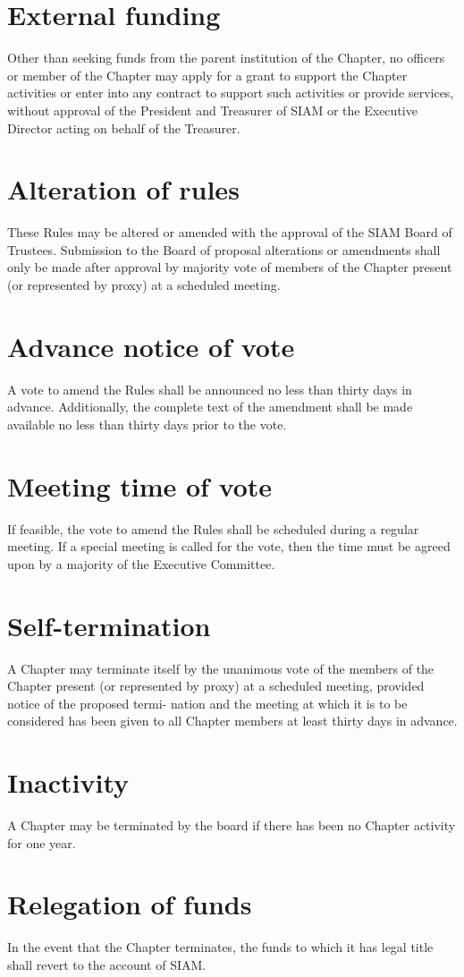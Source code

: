 \documentclass{ronr-bylaws}
\begin{document}
\section{External funding}
Other than seeking funds from the parent institution of the Chapter, no officers
or member of the Chapter may apply for a grant to support the Chapter activities or enter into
any contract to support such activities or provide services, without approval of the President and
Treasurer of SIAM or the Executive Director acting on behalf of the Treasurer.

\section{Alteration of rules}
These Rules may be altered or amended with the approval of the SIAM Board of Trustees. Submission to the Board of proposal alterations or amendments shall only be made after approval by majority vote of members of the Chapter present (or represented by proxy) at a scheduled meeting.

\section{Advance notice of vote}
A vote to amend the Rules shall be announced no less than thirty days in advance. Additionally,
the complete text of the amendment shall be made available no less than thirty days prior to the
vote.

\section{Meeting time of vote}
If feasible, the vote to amend the Rules shall be scheduled during a regular meeting. If a special
meeting is called for the vote, then the time must be agreed upon by a majority of the Executive
Committee.

\section{Self-termination}
A Chapter may terminate itself by the unanimous vote of the members of the Chapter
present (or represented by proxy) at a scheduled meeting, provided notice of the proposed termi-
nation and the meeting at which it is to be considered has been given to all Chapter members at
least thirty days in advance.

\section{Inactivity}
A Chapter may be terminated by the board if there has been no Chapter activity for
one year.

\section{Relegation of funds}
In the event that the Chapter terminates, the funds to which it has legal title shall
revert to the account of SIAM.
\end{document}

